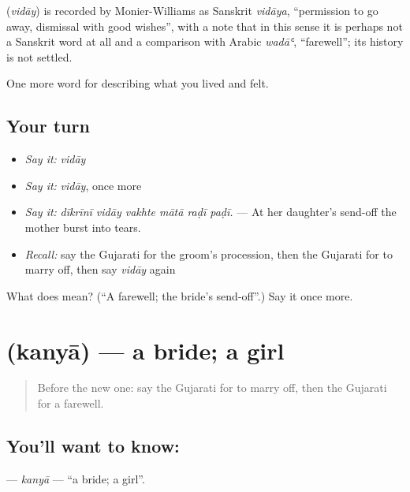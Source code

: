 \begin{cousinweb}
\textbf{} (\emph{vidāy}) is recorded by Monier-Williams as Sanskrit \emph{vidāya}, \textquotedblleft{}permission to go away, dismissal with good wishes\textquotedblright{}, with a note that in this sense it is perhaps not a Sanskrit word at all and a comparison with Arabic \emph{wadāʿ}, \textquotedblleft{}farewell\textquotedblright{}; its history is not settled.
\end{cousinweb}

\begin{grammarlens}[title={What you've built}]
One more word for describing what you lived and felt.
\end{grammarlens}

\subsection*{Your turn}
\begin{itemize}
\raggedright
  \item \emph{Say it:} \emph{vidāy}
  \item \emph{Say it:} \emph{vidāy}, once more
  \item \emph{Say it:} \emph{dīkrīnī vidāy vakhte mātā raḍī paḍī.} — At her daughter's send-off the mother burst into tears.
  \item \emph{Recall:} say the Gujarati for the groom's procession, then the Gujarati for to marry off, then say \emph{vidāy} again
\end{itemize}

\begin{tcolorbox}[breakable,colback=teal!4,colframe=teal!35!black,title={Before you move on}]
What does  mean? (\textquotedblleft{}A farewell; the bride's send-off\textquotedblright{}.) Say it once more.
\end{tcolorbox}
\section[\texorpdfstring{\gu{કન્યા} (kanyā)}{કન્યા (kanyā)}]{ (kanyā) — a bride; a girl}

\label{lesson:GU-C498-kanya}



\begin{quote}
Before the new one: say the Gujarati for to marry off, then the Gujarati for a farewell.
\end{quote}

\subsection*{You'll want to know: }
\textbf{} — \emph{kanyā} — \textquotedblleft{}a bride; a girl\textquotedblright{}.

